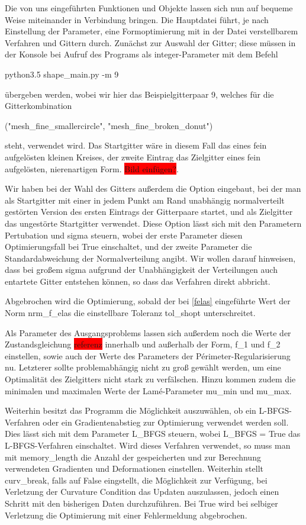 Die von uns eingeführten Funktionen und Objekte lassen sich nun auf bequeme Weise miteinander in Verbindung bringen. Die Hauptdatei führt, je nach Einstellung der Parameter, eine Formoptimierung mit in der Datei verstellbarem Verfahren und Gittern durch. Zunächst zur Auswahl der Gitter; diese müssen in der Konsole bei Aufruf des Programs als \textsf{integer}-Parameter mit dem Befehl
\begin{center}
 \textsf{python3.5 shape\_main.py -m 9}
\end{center}
übergeben werden, wobei wir hier das Beispielgitterpaar 9, welches für die Gitterkombination
\begin{center}
\textsf{("mesh\_fine\_smallercircle", "mesh\_fine\_broken\_donut")}
\end{center}
steht, verwendet wird. Das Startgitter wäre in diesem Fall das eines fein aufgelösten kleinen Kreises, der zweite Eintrag das Zielgitter eines fein aufgelösten, nierenartigen Form. \colorbox{red}{Bild einfügen?}.

Wir haben bei der Wahl des Gitters außerdem die Option eingebaut, bei der man als Startgitter mit einer in jedem Punkt am Rand unabhängig normalverteilt gestörten Version des ersten Eintrags der Gitterpaare startet, und als Zielgitter das ungestörte Startgitter verwendet. Diese Option lässt sich mit den Parametern \textsf{Pertubation} und \textsf{sigma} steuern, wobei der erste Parameter diesen Optimierungsfall bei \textsf{True} einschaltet, und der zweite Parameter die Standardabweichung der Normalverteilung angibt. Wir wollen darauf hinweisen, dass bei großem \textsf{sigma} aufgrund der Unabhängigkeit der Verteilungen auch entartete Gitter entstehen können, so dass das Verfahren direkt abbricht.

Abgebrochen wird die Optimierung, sobald der bei \ref{felas} eingeführte Wert der Norm \textsf{nrm\_f\_elas} die einstellbare Toleranz \textsf{tol\_shopt} unterschreitet.

Als Parameter des Ausgangsproblems lassen sich außerdem noch die Werte der Zustandsgleichung \colorbox{red}{referenz} innerhalb und außerhalb der Form, \textsf{f\_1} und \textsf{f\_2} einstellen, sowie auch der Werte des Parameters der Périmeter-Regularisierung \textsf{nu}. Letzterer sollte problemabhängig nicht zu groß gewählt werden, um eine Optimalität des Zielgitters nicht stark zu verfälschen. Hinzu kommen zudem die minimalen und maximalen Werte der Lamé-Parameter \textsf{mu\_min} und \textsf{mu\_max}.

Weiterhin besitzt das Programm die Möglichkeit auszuwählen, ob ein L-BFGS-Verfahren oder ein Gradientenabstieg zur Optimierung verwendet werden soll. Dies lässt sich mit dem Parameter \textsf{L\_BFGS} steuern, wobei \textsf{L\_BFGS = True} das L-BFGS-Verfahren einschaltet. Wird dieses Verfahren verwendet, so muss man mit \textsf{memory\_length} die Anzahl der gespeicherten und zur Berechnung verwendeten Gradienten und Deformationen einstellen. Weiterhin stellt \textsf{curv\_break}, falls auf \textsf{False} eingstellt, die Möglichkeit zur Verfügung, bei Verletzung der Curvature Condition das Updaten auszulassen, jedoch einen Schritt mit den bisherigen Daten durchzuführen. Bei \textsf{True} wird bei selbiger Verletzung die Optimierung mit einer Fehlermeldung abgebrochen.

